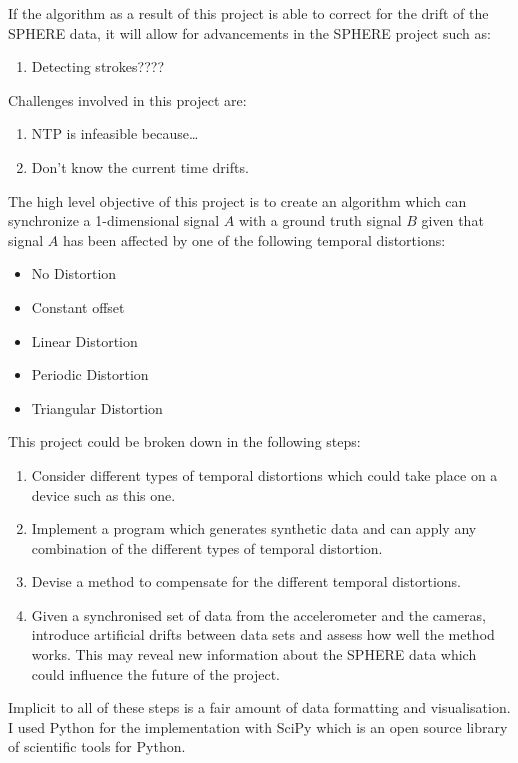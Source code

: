 If the algorithm as a result of this project is able to correct for the drift of the SPHERE data, it will allow for advancements in the SPHERE project such as:
\begin{enumerate}
	\item Detecting strokes????
\end{enumerate}

Challenges involved in this project are:
\begin{enumerate}
	\item NTP is infeasible because\ldots
	\item Don’t know the current time drifts.
\end{enumerate}

The high level objective of this project is to create an algorithm which can synchronize a 1-dimensional signal $A$ with a ground truth signal $B$ given that signal $A$ has been affected by one of the following temporal distortions:
\begin{itemize}
	\item No Distortion
	\item Constant offset
	\item Linear Distortion
	\item Periodic Distortion
	\item Triangular Distortion
\end{itemize}

This project could be broken down in the following steps:
\begin{enumerate}
    \item Consider different types of temporal distortions which could take place on a device such as this one.
    \item Implement a program which generates synthetic data and can apply any combination of the different types of temporal distortion.
    \item Devise a method to compensate for the different temporal distortions.
    \item Given a synchronised set of data from the accelerometer and the cameras, introduce artificial drifts between data sets and assess how well the method works. This may reveal new information about the SPHERE data which could influence the future of the project.
\end{enumerate}

Implicit to all of these steps is a fair amount of data formatting and visualisation. I used Python for the implementation with SciPy which is an open source library of scientific tools for Python.